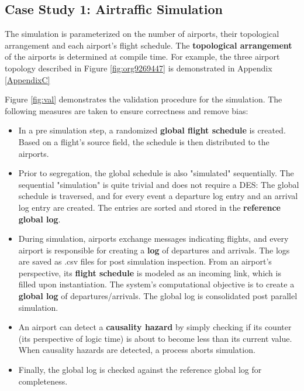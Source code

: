\documentclass[11pt]{article}
\begin{document}
\subsection{Case Study 1: Airtraffic Simulation}
\label{sec:org527f491}
The simulation is parameterized on the number of airports, their topological arrangement and each airport's flight schedule.
The \textbf{topological arrangement} of the airports is determined at compile time.
For example, the three airport topology described in Figure \ref{fig:org9269447} is demonstrated in Appendix \ref{AppendixC}

Figure \ref{fig:val} demonstrates the validation procedure for the simulation.
The following measures are taken to ensure correctness and remove bias:
\begin{itemize}
\item In a pre simulation step, a randomized \textbf{global flight schedule} is created.
Based on a flight's source field, the schedule is then distributed to the airports.
\item Prior to segregation, the global schedule is also "simulated" sequentially. 
The sequential "simulation" is quite trivial and does not require a DES:
The global schedule is traversed, and for every event a departure log entry and an arrival log entry are created.
The entries are sorted and stored in the \textbf{reference global log}.
\item During simulation, airports exchange messages indicating flights, and every airport is responsible for creating a \textbf{log} of departures and arrivals.
The logs are saved as .csv files for post simulation inspection.
From an airport's perspective, its \textbf{flight schedule} is modeled as an incoming link, which is filled upon instantiation.
The system's computational objective is to create a \textbf{global log} of departures/arrivals.
The global log is consolidated post parallel simulation.
\item An airport can detect a \textbf{causality hazard} by simply checking if its counter (its perspective of logic time) is about to become less than its current value.
When causality hazards are detected, a process aborts simulation.
\item Finally, the global log is checked against the reference global log for completeness.
\end{itemize}
\end{document}
